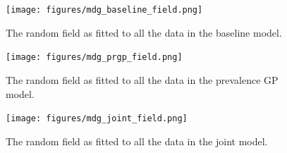 \documentclass[10pt,a4]{article}
\begin{document}
\begin{figure}[h!]
\centering

\texttt{[image: figures/mdg\_baseline\_field.png]}

\caption{The random field as fitted to all the data in the baseline model.}
\end{figure}
\begin{figure}[h!]
\centering

\texttt{[image: figures/mdg\_prgp\_field.png]}

\caption{The random field as fitted to all the data in the prevalence GP model.}
\end{figure}

\begin{figure}[h!]
\centering

\texttt{[image: figures/mdg\_joint\_field.png]}

\caption{The random field as fitted to all the data in the joint model.}
\end{figure}
\end{document}

